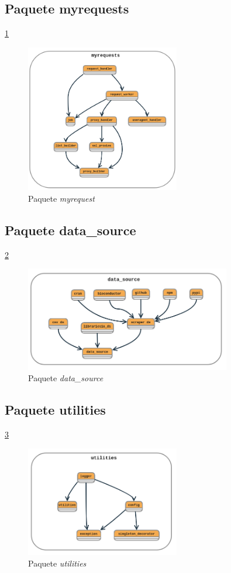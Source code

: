 \subsection{Paquete myrequests} \ref{fig:myrequests}

\begin{figure}[ht!]
    \centering
    \includegraphics[width=0.6\textwidth]{img/anexos/myrequest.png}
    \caption{Paquete \textit{myrequest}}
    \label{fig:myrequests}
\end{figure}

\subsection{Paquete data\_source} \ref{fig:data_source}

\begin{figure}[ht!]
    \centering
    \includegraphics[width=0.8\textwidth]{img/anexos/data_source.png}
    \caption{Paquete \textit{data\_source}}
    \label{fig:data_source}
\end{figure}

\subsection{Paquete utilities} \ref{fig:utilities_package}

\begin{figure}[ht!]
    \centering
    \includegraphics[width=0.6\textwidth]{img/anexos/utilities.png}
    \caption{Paquete \textit{utilities}}
    \label{fig:utilities_package}
\end{figure}